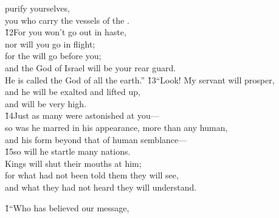 \begin{poetry}
\poemll    purify yourselves, \\
\poemlll       you who carry the vessels of the . \\
\poeml \v{12}For you won't go out in haste, \\
\poemll    nor will you go in flight; \\
\poeml for the  will go before you; \\
\poemll    and the God of Israel will be your rear guard. \\
\poemlll       He is called the God of all the earth.''
\poeml \v{13}``Look! My servant will prosper, \\
\poemll    and he will be exalted and lifted up, \\
\poemlll       and will be very high. \\
\poeml \v{14}Just as many were astonished at you--- \\
\poemll    so was he marred in his appearance, more than any human, \\
\poeml and his form beyond that of human semblance--- \\
\poeml \v{15}so will he startle many nations. \\
\poeml Kings will shut their mouths at him; \\
\poemll    for what had not been told them they will see, \\
\poemlll       and what they had not heard they will understand.
\end{poetry}

\v{1}``Who has believed our message,

